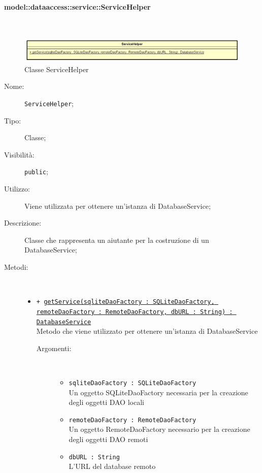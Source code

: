 \documentclass[../DefinizioneDiProdotto.tex]{subfiles}
\begin{document}
\paragraph{model::dataaccess::service::ServiceHelper}
\
\begin{figure}[H]
	\centering
	\includegraphics[width=\maxwidth]{img/ServiceHelper.png}
	\caption{Classe ServiceHelper}\label{fig:model::dataaccess::service::ServiceHelper} 
\end{figure}
\begin{description}
	\item[Nome:] \texttt{ServiceHelper};
	\item[Tipo:] Classe;
	\item[Visibilità:] \texttt{public};
	\item[Utilizzo:] Viene utilizzata per ottenere un'istanza di DatabaseService;
	\item[Descrizione:] Classe che rappresenta un aiutante per la costruzione di un DatabaseService;
	\item[Metodi:] \
	\begin{itemize}
		\item \texttt{+ \underline{getService(sqliteDaoFactory : SQLiteDaoFactory, remoteDaoFactory : RemoteDaoFactory, dbURL : String) : DatabaseService}}\\
		Metodo che viene utilizzato per ottenere un'istanza di DatabaseService
		\begin{description}
			\item[Argomenti:] \
			\begin{itemize}
				\item \texttt{sqliteDaoFactory : SQLiteDaoFactory}\\
				Un oggetto SQLiteDaoFactory necessaria per la creazione degli oggetti DAO locali\item \texttt{remoteDaoFactory : RemoteDaoFactory}\\
				Un oggetto RemoteDaoFactory necessario per la creazione degli oggetti DAO remoti\item \texttt{dbURL : String}\\
				L'URL del database remoto\end{itemize}
		\end{description}
	\end{itemize}
\end{description}
\end{document}
